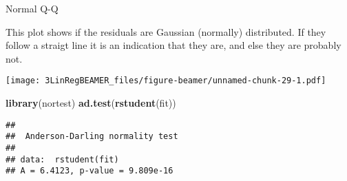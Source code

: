\documentclass[ignorenonframetext,]{beamer}
\newenvironment{Shaded}{\begin{snugshade}}{\end{snugshade}}
\newcommand{\KeywordTok}[1]{\textcolor[rgb]{0.13,0.29,0.53}{\textbf{#1}}}
\newcommand{\DataTypeTok}[1]{\textcolor[rgb]{0.13,0.29,0.53}{#1}}
\newcommand{\DecValTok}[1]{\textcolor[rgb]{0.00,0.00,0.81}{#1}}
\newcommand{\StringTok}[1]{\textcolor[rgb]{0.31,0.60,0.02}{#1}}
\newcommand{\OperatorTok}[1]{\textcolor[rgb]{0.81,0.36,0.00}{\textbf{#1}}}
\newcommand{\NormalTok}[1]{#1}
\begin{document}
\begin{frame}[fragile]

\begin{block}{Normal Q-Q}

This plot shows if the residuals are Gaussian (normally) distributed. If
they follow a straigt line it is an indication that they are, and else
they are probably not.

\footnotesize

\begin{Shaded}
\end{Shaded}

\texttt{[image: 3LinRegBEAMER\_files/figure-beamer/unnamed-chunk-29-1.pdf]}

\begin{Shaded}
\begin{Highlighting}[]
\KeywordTok{library}\NormalTok{(nortest)}
\KeywordTok{ad.test}\NormalTok{(}\KeywordTok{rstudent}\NormalTok{(fit))}
\end{Highlighting}
\end{Shaded}

\begin{verbatim}
## 
##  Anderson-Darling normality test
## 
## data:  rstudent(fit)
## A = 6.4123, p-value = 9.809e-16
\end{verbatim}

\normalsize

\end{block}

\end{frame}
\end{document}
